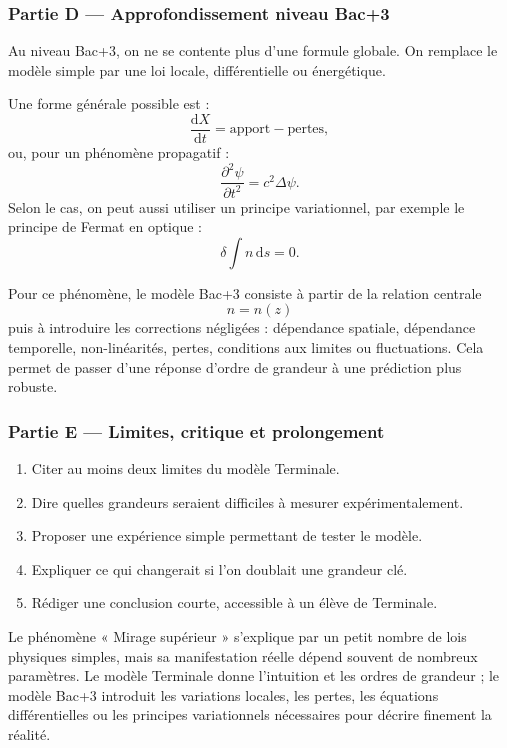 \documentclass[11pt,a4paper]{article}
\begin{document}
\subsubsection*{Partie D — Approfondissement niveau Bac+3}

\begin{approfondissementbox}
Au niveau Bac+3, on ne se contente plus d'une formule globale. On remplace le modèle simple par une loi locale, différentielle ou énergétique.

Une forme générale possible est :
\[
\frac{\mathrm d X}{\mathrm dt}=\text{apport}-\text{pertes},
\]
ou, pour un phénomène propagatif :
\[
\frac{\partial^2 \psi}{\partial t^2}=c^2\Delta\psi.
\]
Selon le cas, on peut aussi utiliser un principe variationnel, par exemple le principe de Fermat en optique :
\[
\delta \int n\,\mathrm ds=0.
\]

Pour ce phénomène, le modèle Bac+3 consiste à partir de la relation centrale
\[
n=n(z)
\]
puis à introduire les corrections négligées : dépendance spatiale, dépendance temporelle, non-linéarités, pertes, conditions aux limites ou fluctuations. Cela permet de passer d'une réponse d'ordre de grandeur à une prédiction plus robuste.
\end{approfondissementbox}

\subsubsection*{Partie E — Limites, critique et prolongement}

\begin{enumerate}
  \item Citer au moins deux limites du modèle Terminale.
  \item Dire quelles grandeurs seraient difficiles à mesurer expérimentalement.
  \item Proposer une expérience simple permettant de tester le modèle.
  \item Expliquer ce qui changerait si l'on doublait une grandeur clé.
  \item Rédiger une conclusion courte, accessible à un élève de Terminale.
\end{enumerate}

\begin{corrigebox}
Le phénomène « Mirage supérieur » s'explique par un petit nombre de lois physiques simples, mais sa manifestation réelle dépend souvent de nombreux paramètres. Le modèle Terminale donne l'intuition et les ordres de grandeur ; le modèle Bac+3 introduit les variations locales, les pertes, les équations différentielles ou les principes variationnels nécessaires pour décrire finement la réalité.
\end{corrigebox}
\end{document}
